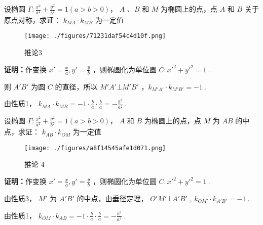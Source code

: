 \begin{corollary}{}
设椭圆 $\displaystyle{\Gamma:\frac{x^2}{a^2}+\frac{y^2}{b^2}=1(a>b>0)}$， $\displaystyle{A}$ 、$\displaystyle{B}$ 和 $\displaystyle{M}$ 为椭圆上的点，点 $\displaystyle{A}$ 和 $\displaystyle{B}$ 关于原点对称，求证： $\displaystyle{k_{MA}\cdot k_{MB}}$ 为一定值

\begin{figure}[ht]
\centering
\texttt{[image: ./figures/71231daf54c4d10f.png]}
\caption{推论3} \label{fig_affine_2}
\end{figure}

\textbf{证明：}作变换 $\displaystyle{x'=\frac{x}{a},y'=\frac{y}{b}}$ ，则椭圆化为单位圆 $\displaystyle{C:x'^2+y'^2=1}~.$

则 $\displaystyle{A'B'}$ 为圆 $\displaystyle{C}$ 的直径，所以 $\displaystyle{M'A'\bot M'B'}$ ，$\displaystyle{k_{M'A'}\cdot k_{M'B'}=-1}~.$

由性质1， $\displaystyle{k_{MA}\cdot k_{MB}=-1\cdot \frac{b}{a}\cdot \frac{b}{a}=-\frac{b^2}{a^2}}~.$

\end{corollary}

\begin{corollary}{}
设椭圆 $\displaystyle{\Gamma:\frac{x^2}{a^2}+\frac{y^2}{b^2}=1(a>b>0)}$， $\displaystyle{A}$ 和 $\displaystyle{B}$ 为椭圆上的点，点 $\displaystyle{M}$ 为 $\displaystyle{AB}$ 的中点，求证： $\displaystyle{k_{AB}\cdot k_{OM}}$ 为一定值

\begin{figure}[ht]
\centering
\texttt{[image: ./figures/a8f14545afe1d071.png]}
\caption{推论 4} \label{fig_affine_3}
\end{figure}

\textbf{证明：}作变换 $\displaystyle{x'=\frac{x}{a},y'=\frac{y}{b}}$ ，则椭圆化为单位圆 $\displaystyle{C:x'^2+y'^2=1}~.$

由性质3， $\displaystyle{M'}$ 为 $\displaystyle{A'B'}$ 的中点，由垂径定理， $\displaystyle{O'M'\bot A'B'}$ , $\displaystyle{k_{OM'}\cdot k_{A'B'}=-1}~.$

由性质1， $\displaystyle{k_{OM}\cdot k_{AB}=-1\cdot \frac{b}{a}\cdot \frac{b}{a}=-\frac{b^2}{a^2}}~.$

\end{corollary} 

